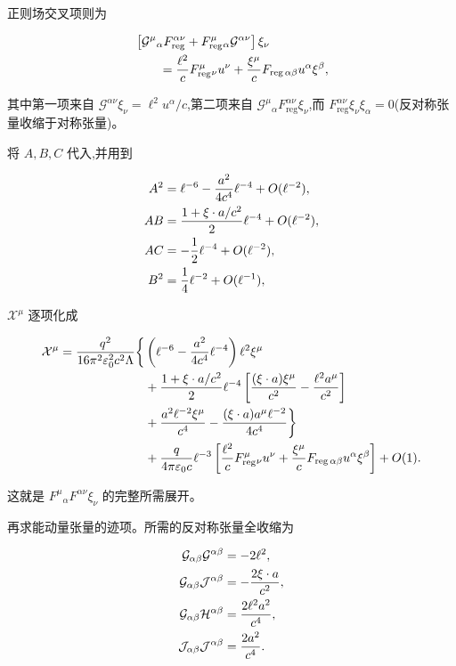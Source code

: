 正则场交叉项则为

\begin{align*}
 &\left[
 \mathcal G^\mu{}_\alpha F_{\mathrm{reg}}^{\alpha\nu}
 +F_{\mathrm{reg}}^\mu{}_\alpha\mathcal G^{\alpha\nu}
 \right]\xi_\nu\\
 &\qquad
 ={\ell^2\over c}F_{\mathrm{reg}}^\mu{}_\nu u^\nu
 +{\xi^\mu\over c}F_{\mathrm{reg}\,\alpha\beta}u^\alpha\xi^\beta,
\end{align*}

其中第一项来自 $\mathcal G^{\alpha\nu}\xi_\nu=\ell^2u^\alpha/c$,第二项来自 $\mathcal G^\mu{}_\alpha F_{\mathrm{reg}}^{\alpha\nu}\xi_\nu$,而 $F_{\mathrm{reg}}^{\alpha\nu}\xi_\nu\xi_\alpha=0$(反对称张量收缩于对称张量)。

将 $A,B,C$ 代入,并用到

\begin{align*}
 A^2&=\ell^{-6}-{a^2\over4c^4}\ell^{-4}+O(\ell^{-2}),\\
 AB&={1+\xi\cdot a/c^2\over2}\ell^{-4}+O(\ell^{-2}),\\
 AC&=-{1\over2}\ell^{-4}+O(\ell^{-2}),\\
 B^2&={1\over4}\ell^{-2}+O(\ell^{-1}),
\end{align*}

$\mathcal X^\mu$ 逐项化成

\begin{align*}
 \mathcal X^\mu
 ={q^2\over16\pi^2\varepsilon_0^2c^2\Lambda}
 \bigg\{{}
 &\left(\ell^{-6}-{a^2\over4c^4}\ell^{-4}\right)
 \ell^2\xi^\mu\\
 &+{1+\xi\cdot a/c^2\over2}\ell^{-4}
 \left[{(\xi\cdot a)\xi^\mu\over c^2}
 -{\ell^2a^\mu\over c^2}\right]\\
 &+{a^2\ell^{-2}\xi^\mu\over c^4}
 -{(\xi\cdot a)a^\mu\ell^{-2}\over4c^4}
 \bigg\}\\
 &+{q\over4\pi\varepsilon_0c}\ell^{-3}
 \left[
 {\ell^2\over c}F_{\mathrm{reg}}^\mu{}_\nu u^\nu
 +{\xi^\mu\over c}F_{\mathrm{reg}\,\alpha\beta}u^\alpha\xi^\beta
 \right]+O(1).
\end{align*}

这就是 $F^\mu{}_\alpha F^{\alpha\nu}\xi_\nu$ 的完整所需展开。

再求能动量张量的迹项。所需的反对称张量全收缩为

\begin{align*}
 \mathcal G_{\alpha\beta}\mathcal G^{\alpha\beta}
 &=-2\ell^2,\\
 \mathcal G_{\alpha\beta}\mathcal J^{\alpha\beta}
 &=-{2\xi\cdot a\over c^2},\\
 \mathcal G_{\alpha\beta}\mathcal H^{\alpha\beta}
 &={2\ell^2a^2\over c^4},\\
 \mathcal J_{\alpha\beta}\mathcal J^{\alpha\beta}
 &={2a^2\over c^4}.
\end{align*}


